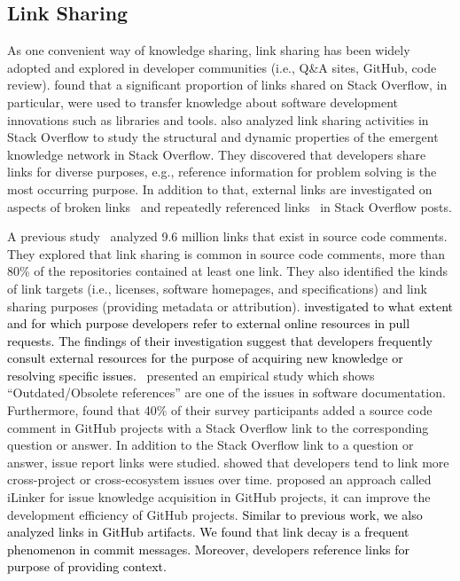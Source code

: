 \documentclass[smallextended]{svjour3}       %
\newcommand{\fix}[1]{\textcolor{black}{#1}}
\begin{document}
\subsection{Link Sharing}
As one convenient way of knowledge sharing, link sharing has been widely adopted and explored in developer communities (i.e., Q\&A sites, GitHub, code review). \cite{gomez2013study} found that a significant proportion of links shared on Stack Overflow, in particular, were used to transfer knowledge about software development innovations such as libraries and tools. \cite{ye2017structure} also analyzed link sharing activities in Stack Overflow to study the structural and dynamic properties of the emergent knowledge network in Stack Overflow. They discovered that developers share links for diverse purposes, e.g., reference information for problem solving is the most occurring purpose. In addition to that, external links are investigated on aspects of broken links~\citep{liu2021broken} and repeatedly referenced links~\cite{liu2022exploratory} in Stack Overflow posts.

A previous study~\citep{hata20199} analyzed 9.6 million links that exist in source code comments. They explored that link sharing is common in source code comments, more than 80\% of the repositories contained at least one link. They also identified the kinds of link targets (i.e., licenses, software homepages, and specifications) and link sharing purposes (providing metadata or attribution).  \fix{\cite{zampetti2017developers} investigated
to what extent and for which purpose developers refer to external online resources in pull requests. The findings of their investigation suggest that developers frequently consult external resources for the purpose of acquiring new knowledge or resolving specific issues.}~\cite{aghajani2019software} presented an empirical study which shows ``Outdated/Obsolete references'' are one of the issues in software documentation. 
Furthermore, \cite{baltes2019usage} found that 40\% of their survey participants added a source code comment in GitHub projects with a Stack Overflow link to the corresponding question or answer. In addition to the Stack Overflow link to a question or answer, issue report links were studied. \cite{zhang2018within} showed that developers tend to link more cross-project or cross-ecosystem issues over time. \cite{zhang2020ilinker} proposed an approach called iLinker for issue knowledge acquisition in GitHub projects, it can improve the development efficiency of GitHub projects. \fix{Similar to previous work, we also analyzed links in GitHub artifacts. We found that link decay is a frequent phenomenon in commit messages. Moreover, developers reference links for purpose of providing context. }
\end{document}
